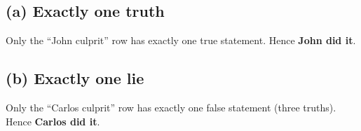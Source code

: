 \subsection*{(a) Exactly one truth}
Only the “John culprit” row has exactly one true statement. Hence \textbf{John did it}.

\subsection*{(b) Exactly one lie}
Only the “Carlos culprit” row has exactly one false statement (three truths). Hence \textbf{Carlos did it}.
